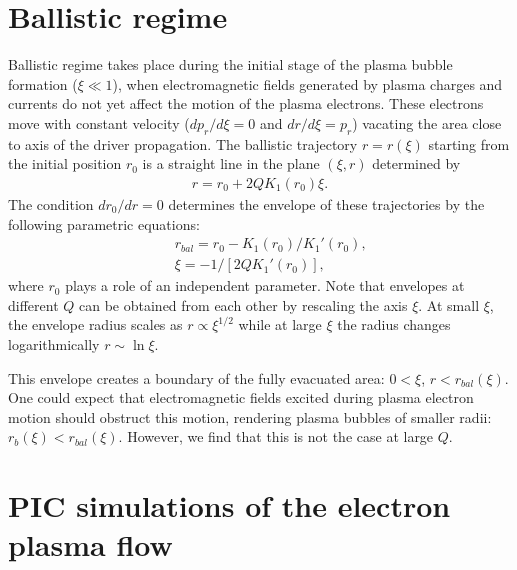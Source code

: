 \documentclass[twocolumn,showpacs,aip]{revtex4}
\begin{document}
\section{Ballistic regime}
Ballistic regime takes place during  the initial stage of the plasma bubble formation ($\xi\ll 1$), when  electromagnetic fields generated by  plasma charges and currents do not yet affect the motion of the plasma electrons. These  electrons move with constant velocity ($dp_r/d\xi=0$ and $dr/d\xi=p_r$) vacating the area close to axis of the driver propagation.
 The ballistic trajectory $r=r(\xi)$  
 starting from the initial position $r_0$ is a straight line in the plane $(\xi,r)$  determined by
\begin{eqnarray} 
r=r_0+2QK_1(r_0)\xi.
\label{eq:bal_traj}
\end{eqnarray}
The condition $dr_0/dr=0$ determines the  envelope of these trajectories by the following parametric equations:
\begin{eqnarray}
&& r_{bal}=r_0 -K_1(r_0)/K_1'(r_0),
\label{eq:bal_traj2}\\
&& \xi=-1/[2QK_1'(r_0)], \label{eq:bal_traj1}
\end{eqnarray}
where  $r_0$ plays a role of  an independent parameter.   Note that  envelopes at different $Q$ can be obtained from each other by rescaling the axis $\xi$. At small $\xi$, the envelope radius scales as $r\propto \xi^{1/2}$ while at large $\xi$ the  radius changes logarithmically  $r\sim \ln \xi$. 


This envelope creates a boundary of the fully evacuated area: 
$0<\xi$, $r<r_{bal}(\xi)$.
%
One could expect that electromagnetic fields excited during plasma electron motion should obstruct this motion, rendering  plasma bubbles of smaller radii: $r_b(\xi)<r_{bal}(\xi)$. However, we find  that   this is not  the case at large $Q$.


\section{PIC simulations of the electron plasma flow}
\end{document}

